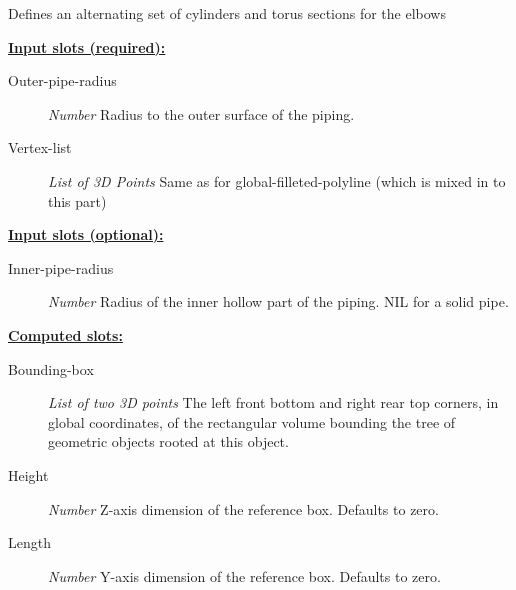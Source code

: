 \documentclass [11pt]{book}
\begin{document}
\begin{itemize}
\begin{description}
Defines an alternating set of cylinders and torus sections for the elbows



\end{description}








\textbf{
\underline{Input slots (required):}}

\begin{description}

\item [Outer-pipe-radius]
\emph{Number} Radius to the outer surface of the piping.


\item [Vertex-list]
\emph{List of 3D Points} Same as for global-filleted-polyline (which is mixed in to this part)


\end{description}






\textbf{
\underline{Input slots (optional):}}

\begin{description}

\item [Inner-pipe-radius]
\emph{Number} Radius of the inner hollow part of the piping. NIL for a solid pipe.


\end{description}






\textbf{
\underline{Computed slots:}}

\begin{description}

\item [Bounding-box]
\emph{List of two 3D points} The left front bottom and right rear top corners, in global coordinates,
of the rectangular volume bounding the tree of geometric objects rooted at this object.


\item [Height]
\emph{Number} Z-axis dimension of the reference box. Defaults to zero.


\item [Length]
\emph{Number} Y-axis dimension of the reference box. Defaults to zero.



\end{description}
\end{itemize}
\end{document}
